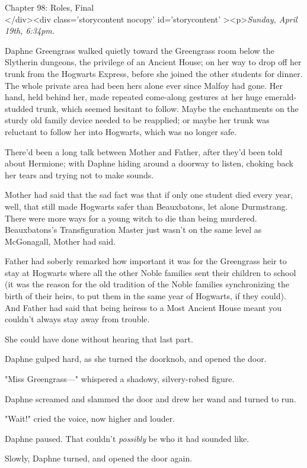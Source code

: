 
Chapter 98: Roles, Final\\
</div><div  class='storycontent nocopy' id='storycontent' ><p>\emph{Sunday, 
April 19th, 6:34pm.}

Daphne Greengrass walked quietly toward the Greengrass room below the Slytherin 
dungeons, the privilege of an Ancient House; on her way to drop off her trunk 
from the Hogwarts Express, before she joined the other students for dinner. The 
whole private area had been hers alone ever since Malfoy had gone. Her hand, 
held behind her, made repeated come-along gestures at her huge emerald-studded 
trunk, which seemed hesitant to follow. Maybe the enchantments on the sturdy 
old family device needed to be reapplied; or maybe her trunk was reluctant to 
follow her into Hogwarts, which was no longer safe.

There'd been a long talk between Mother and Father, after they'd been told 
about Hermione; with Daphne hiding around a doorway to listen, choking back her 
tears and trying not to make sounds.

Mother had said that the sad fact was that if only one student died every year, 
well, that still made Hogwarts safer than Beauxbatons, let alone Durmstrang. 
There were more ways for a young witch to die than being murdered. 
Beauxbatons's Transfiguration Master just wasn't on the same level as 
McGonagall, Mother had said.

Father had soberly remarked how important it was for the Greengrass heir to 
stay at Hogwarts where all the other Noble families sent their children to 
school (it was the reason for the old tradition of the Noble families 
synchronizing the birth of their heirs, to put them in the same year of 
Hogwarts, if they could). And Father had said that being heiress to a Most 
Ancient House meant you couldn't always stay away from trouble.

She could have done without hearing that last part.

Daphne gulped hard, as she turned the doorknob, and opened the door.

"Miss Greengrass---" whispered a shadowy, silvery-robed figure.

Daphne screamed and slammed the door and drew her wand and turned to run.

"Wait!" cried the voice, now higher and louder.

Daphne paused. That couldn't \emph{possibly} be who it had sounded like.

Slowly, Daphne turned, and opened the door again.

